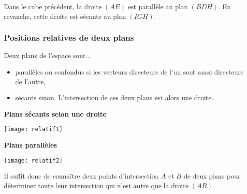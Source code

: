\documentclass[11pt,fleqn, openany]{book} %
\begin{document}
\begin{example}Dans le cube précédent, la droite $(AE)$ est parallèle au plan $(BDH)$. En revanche, cette droite est sécante au plan $(IGH)$.\end{example}

\newpage

\subsubsection{Positions relatives de deux plans}

\begin{proposition}Deux plans de l'espace sont...
\begin{itemize}
\item parallèles ou confondus si les vecteurs directeurs de l'un sont aussi directeurs de l'autre,
\item sécants sinon. L'intersection de ces deux plans est alors une droite.
\end{itemize}\vspace{-0.5cm}\end{proposition}

\begin{minipage}{0.45\linewidth}\begin{center}
\textbf{Plans sécants selon une droite}
\end{center}
\begin{center}
\texttt{[image: relatif1]}
\end{center}
\end{minipage}\hfill \begin{minipage}{0.45\linewidth}\begin{center}
\textbf{Plans parallèles}
\end{center}
\begin{center}
\texttt{[image: relatif2]}
\end{center}
\end{minipage}

Il suffit donc de connaître deux points d'intersection $A$ et $B$  de deux plans pour déterminer toute leur intersection qui n'est autre que la droite $(AB)$.
\end{document}
